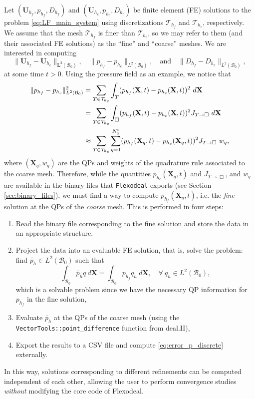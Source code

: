 \documentclass{sfuthesis}
\numberwithin{equation}{section}
\numberwithin{figure}{chapter}
\numberwithin{table}{chapter}
\theoremstyle{definition}
\def\*#1{{\mathbf{#1}}} %
\newcommand{\B}{\mathcal{B}}
\begin{document}
Let $(\*U_{h_f}, p_{h_f}, D_{h_f})$ and $\left(\*U_{h_c}, p_{h_c}, D_{h_c}\right)$ be finite element (FE) solutions to the problem \eqref{eq:LF_main_system} using discretizations $\mathcal{T}_{h_f}$ and $\mathcal{T}_{h_c}$, respectively. We assume that the mesh $\mathcal{T}_{h_f}$ is finer than $\mathcal{T}_{h_c}$, so we may refer to them (and their associated FE solutions) as the ``fine'' and ``coarse'' meshes. We are interested in computing
\[
  \| \*U_{h_f} - \*U_{h_c} \|_{\*L^2(\B_0)}, \quad \| p_{h_f} - p_{h_c} \|_{L^2(\B_0)}, \quad \text{and} \quad  \| D_{h_f} - D_{h_c} \|_{L^2(\B_0)},
\]
at some time $t > 0$. Using the pressure field as an example, we notice that
\begin{align}
    \| p_{h_f} - p_{h_c} \|_{L^2(\B_0)}^2 &= \displaystyle \sum_{T \in \mathcal{T}_{h_c}} \int_{T} (p_{h_f}(\*X, t) - p_{h_c}(\*X, t))^2 \ d\*X \notag \\
    &= \displaystyle \sum_{T \in \mathcal{T}_{h_c}} \int_{\Box} (p_{h_f}(\*X, t) - p_{h_c}(\*X, t))^2 J_{T \to \Box} \ d\*X \notag \\
    &\approx \displaystyle \sum_{T \in \mathcal{T}_{h_c}} \sum_{q=1}^{N_q^c} (p_{h_f}(\*X_q, t) - p_{h_c}(\*X_q, t))^2 J_{T \to \Box} \ w_q, \label{eq:error_p_discrete}
\end{align}
where $(\*X_q, w_q)$ are the QPs and weights of the quadrature rule associated to the coarse mesh. Therefore, while the quantities $p_{h_c}(\*X_q,t)$ and $J_{T \to \Box}$, and $w_q$ are available in the binary files that \texttt{Flexodeal} exports (see Section \ref{sec:binary_files}), we must find a way to compute $p_{h_f}(\*X_q,t)$, i.e. the \textit{fine} solution at the QPs of the \textit{coarse} mesh. This is performed in four steps:
\begin{enumerate}
    \item Read the binary file corresponding to the fine solution and store the data in an appropriate structure,
    \item Project the data into an evaluable FE solution, that is, solve the problem: find $\widetilde{p_h} \in L^2(\B_0)$ such that
    \[
    \int_{\B_0} \widetilde{p_h} q  \ d\*X = \int_{\B_0} p_{h_f} q_h \ d\*X, \quad \forall \ q_h \in L^2(\B_0),
    \]
    which is a solvable problem since we have the necessary QP information for $p_{h_f}$ in the fine solution,
    \item Evaluate $\widetilde{p_h}$ at the QPs of the coarse mesh (using the \texttt{VectorTools::point\_difference} function from deal.II),
    \item Export the results to a CSV file and compute \eqref{eq:error_p_discrete} externally.
\end{enumerate}
In this way, solutions corresponding to different refinements can be computed independent of each other, allowing the user to perform convergence studies \textit{without} modifying the core code of Flexodeal.
\end{document}
